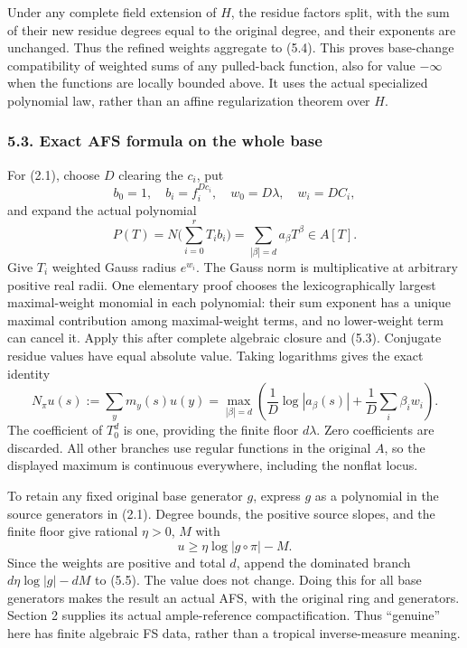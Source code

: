 \documentclass[
  10pt,
]{article}
\begin{document}
Under any complete field extension of \(H\), the residue factors split,
with the sum of their new residue degrees equal to the original degree,
and their exponents are unchanged. Thus the refined weights aggregate to
(5.4). This proves base-change compatibility of weighted sums of any
pulled-back function, also for value \(-\infty\) when the functions are
locally bounded above. It uses the actual specialized polynomial law,
rather than an affine regularization theorem over \(H\).

\subsubsection{5.3. Exact AFS formula on the whole
base}\label{exact-afs-formula-on-the-whole-base}

For (2.1), choose \(D\) clearing the \(c_i\), put
\[b_0=1,\quad b_i=f_i^{Dc_i},\quad w_0=D\lambda,\quad w_i=DC_i,\] and
expand the actual polynomial
\[P(T)=N\bigl(\sum_{i=0}^rT_i b_i\bigr)=\sum_{|\beta|=d}a_\beta T^\beta\in A[T].\]
Give \(T_i\) weighted Gauss radius \(e^{w_i}\). The Gauss norm is
multiplicative at arbitrary positive real radii. One elementary proof
chooses the lexicographically largest maximal-weight monomial in each
polynomial: their sum exponent has a unique maximal contribution among
maximal-weight terms, and no lower-weight term can cancel it. Apply this
after complete algebraic closure and (5.3). Conjugate residue values
have equal absolute value. Taking logarithms gives the exact identity
\[N_\pi u(s):=\sum_y m_y(s)u(y)
 =\max_{|\beta|=d}\left(\frac1D\log|a_\beta(s)|+\frac1D\sum_i\beta_iw_i\right).\tag{5.5}\]
The coefficient of \(T_0^d\) is one, providing the finite floor
\(d\lambda\). Zero coefficients are discarded. All other branches use
regular functions in the original \(A\), so the displayed maximum is
continuous everywhere, including the nonflat locus.

To retain any fixed original base generator \(g\), express \(g\) as a
polynomial in the source generators in (2.1). Degree bounds, the
positive source slopes, and the finite floor give rational \(\eta>0\),
\(M\) with \[u\ge\eta\log|g\circ\pi|-M.\] Since the weights are positive
and total \(d\), append the dominated branch \(d\eta\log|g|-dM\) to
(5.5). The value does not change. Doing this for all base generators
makes the result an actual AFS, with the original ring and generators.
Section 2 supplies its actual ample-reference compactification. Thus
``genuine'' here has finite algebraic FS data, rather than a tropical
inverse-measure meaning.
\end{document}

